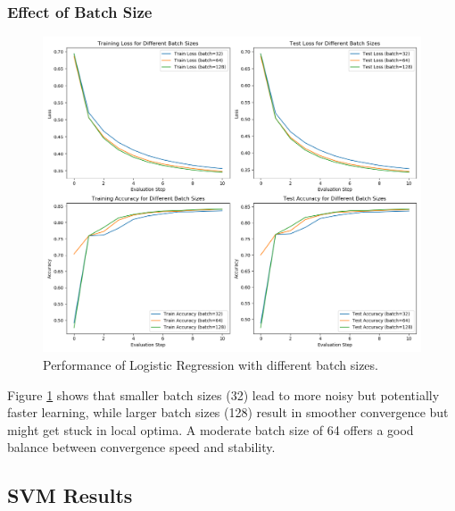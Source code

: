 \documentclass[journal, a4paper]{IEEEtran}
\begin{document}
\subsubsection{Effect of Batch Size}
\begin{figure}[htbp]
\centering
\includegraphics[width=\linewidth]{logistic_regression_batch_sizes.png}
\caption{Performance of Logistic Regression with different batch sizes.}
\label{fig:lr_batch}
\end{figure}

Figure \ref{fig:lr_batch} shows that smaller batch sizes (32) lead to more noisy but potentially faster learning, while larger batch sizes (128) result in smoother convergence but might get stuck in local optima. A moderate batch size of 64 offers a good balance between convergence speed and stability.

\subsection{SVM Results}
\end{document}
